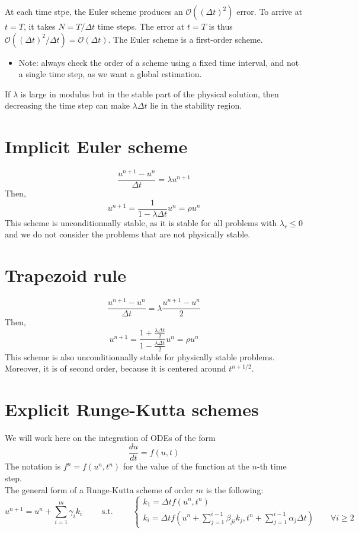 \documentclass[12pt, openany]{report}
\theoremstyle{definition}
\begin{document}
At each time stpe, the Euler scheme produces an $\mathcal{O}((\Delta t)^2)$ error. To arrive at $t=T$, it takes $N=T/\Delta t$ time steps. The error at $t=T$ is thus $\mathcal{O}((\Delta t)^2/\Delta t) = \mathcal{O}(\Delta t)$. The Euler scheme is a first-order scheme.
\begin{itemize}
	\item [$\to$] Note: always check the order of a scheme using a fixed time interval, and not a single time step, as we want a global estimation. 
\end{itemize}
If $\lambda$ is large in modulus but in the stable part of the physical solution, then decreasing the time step can make $\lambda \Delta t$ lie in the stability region. 
\section{Implicit Euler scheme}
\begin{equation}
	\frac{u^{n+1}-u^n}{\Delta t} = \lambda u^{n+1}
\end{equation}
Then, 
\begin{equation}
	u^{n+1} = \frac{1}{1-\lambda \Delta t} u^n = \rho u^n 
\end{equation}
This scheme is unconditionnally stable, as it is stable for all problems with $\lambda_r \le 0$ and we do not consider the problems that are not physically stable. 
\section{Trapezoid rule}
\begin{equation}
	\frac{u^{n+1}-u^n }{\Delta t} = \lambda \frac{u^{n+1}-u^n}{2}
\end{equation}
Then, 
\begin{equation}
	u^{n+1} = \frac{1+\frac{\lambda \Delta t}{2}}{1-\frac{\lambda \Delta t}{2}} u^n = \rho u^n
\end{equation}
This scheme is also unconditionnally stable for physically stable problems. Moreover, it is of second order, because it is centered around $t^{n+1/2}$. 
\section{Explicit Runge-Kutta schemes}
We will work here on the integration of ODEs of the form 
\begin{equation}
	\frac{du}{dt} = f(u,t)
\end{equation}
The notation is $f^n = f(u^n,t^n)$ for the value of the function at the $n$-th time step. \\ 
The general form of a Runge-Kutta scheme of order $m$ is the following:
\begin{equation}
	u^{n+1} = u^n + \sum_{i=1}^m \gamma_ik_i \qquad \text{ s.t. }\qquad \begin{cases}
		k_1 = \Delta t f(u^n, t^n)\\
		k_i = \Delta t f(u^n + \sum_{j=1}^{i-1}\beta_{ji} k_j, t^n + \sum_{j=1}^{i-1} \alpha_j \Delta t) \qquad \forall i \ge 2
	\end{cases}
\end{equation}
\end{document}
